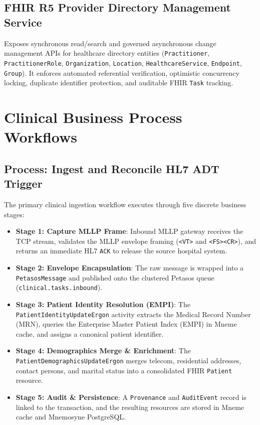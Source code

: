 \subsection{FHIR R5 Provider Directory Management Service}
Exposes synchronous read/search and governed asynchronous change management APIs for healthcare directory entities (\texttt{Practitioner}, \texttt{PractitionerRole}, \texttt{Organization}, \texttt{Location}, \texttt{HealthcareService}, \texttt{Endpoint}, \texttt{Group}). It enforces automated referential verification, optimistic concurrency locking, duplicate identifier protection, and auditable FHIR \texttt{Task} tracking.

\section{Clinical Business Process Workflows}

\subsection{Process: Ingest and Reconcile HL7 ADT Trigger}
The primary clinical ingestion workflow executes through five discrete business stages:
\begin{itemize}
    \item \textbf{Stage 1: Capture MLLP Frame}: Inbound MLLP gateway receives the TCP stream, validates the MLLP envelope framing (\texttt{<VT>} and \texttt{<FS><CR>}), and returns an immediate HL7 \texttt{ACK} to release the source hospital system.
    \item \textbf{Stage 2: Envelope Encapsulation}: The raw message is wrapped into a \texttt{PetasosMessage} and published onto the clustered Petasos queue (\texttt{clinical.tasks.inbound}).
    \item \textbf{Stage 3: Patient Identity Resolution (EMPI)}: The \texttt{PatientIdentityUpdateErgon} activity extracts the Medical Record Number (MRN), queries the Enterprise Master Patient Index (EMPI) in Mneme cache, and assigns a canonical patient identifier.
    \item \textbf{Stage 4: Demographics Merge \& Enrichment}: The \texttt{PatientDemographicsUpdateErgon} merges telecom, residential addresses, contact persons, and marital status into a consolidated FHIR \texttt{Patient} resource.
    \item \textbf{Stage 5: Audit \& Persistence}: A \texttt{Provenance} and \texttt{AuditEvent} record is linked to the transaction, and the resulting resources are stored in Mneme cache and Mnemosyne PostgreSQL.
\end{itemize}

